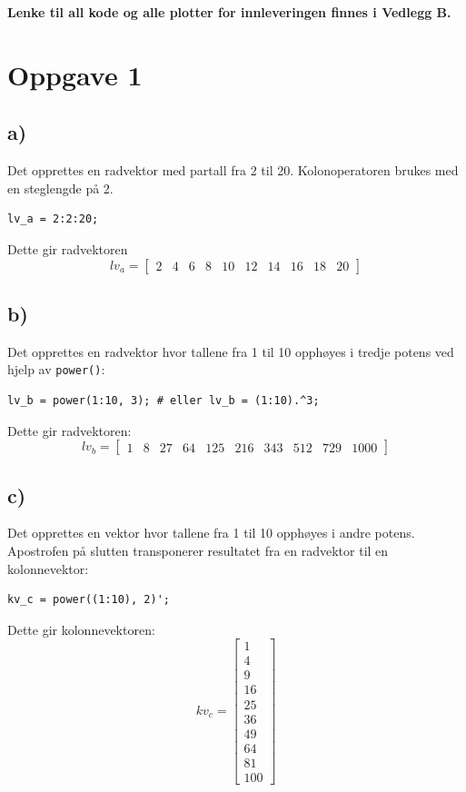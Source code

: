 \noindent \textbf{Lenke til all kode og alle plotter for innleveringen finnes i Vedlegg B.}

\hypertarget{oppgave1}{}
\section*{Oppgave 1}

\subsection*{a)}
Det opprettes en radvektor med partall fra 2 til 20. 
Kolonoperatoren brukes med en steglengde på 2.
\begin{verbatim}
lv_a = 2:2:20;
\end{verbatim}
Dette gir radvektoren
\[
lv_a =
\begin{bmatrix}
2 & 4 & 6 & 8 & 10 & 12 & 14 & 16 & 18 & 20
\end{bmatrix}
\]

\subsection*{b)}
Det opprettes en radvektor hvor tallene fra 1 til 10 opphøyes
i tredje potens ved hjelp av \texttt{power()}:
\begin{verbatim}
lv_b = power(1:10, 3); # eller lv_b = (1:10).^3;
\end{verbatim}
Dette gir radvektoren:
\[
lv_b =
\begin{bmatrix}
1 & 8 & 27 & 64 & 125 & 216 & 343 & 512 & 729 & 1000
\end{bmatrix}
\]

\subsection*{c)}
Det opprettes en vektor hvor tallene fra 1 til 10 opphøyes
i andre potens. Apostrofen på slutten transponerer resultatet
fra en radvektor til en kolonnevektor:
\begin{verbatim}
kv_c = power((1:10), 2)';
\end{verbatim}
Dette gir kolonnevektoren:
\[
kv_c =
\begin{bmatrix}
1 \\
4 \\
9 \\
16 \\
25 \\
36 \\
49 \\
64 \\
81 \\
100
\end{bmatrix}
\]
